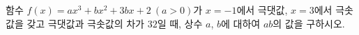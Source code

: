 함수 $f(x)=ax^3+bx^2+3bx+2\ (a>0)$가 $x=-1$에서 극댓값, $x=3$에서 극솟값을 갖고 극댓값과 극솟값의 차가 $32$일 때, 상수 $a$, $b$에 대하여 $ab$의 값을 구하시오.
